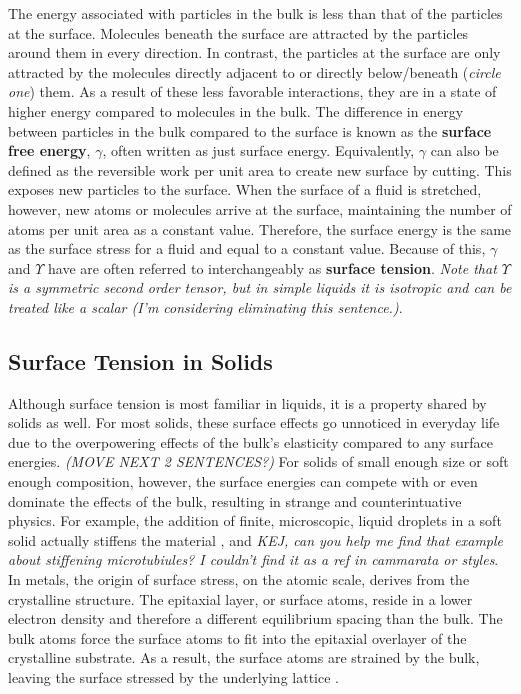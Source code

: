 The energy associated with particles in the bulk is less than that of the particles at the surface. Molecules beneath the surface are attracted by the particles around them in every direction. In contrast, the particles at the surface are only attracted by the molecules directly adjacent to or directly below/beneath (\emph{circle one}) them. As a result of these less favorable interactions, they are in a state of higher energy compared to molecules in the bulk. The difference in energy between particles in the bulk compared to the surface is known as the \textbf{surface free energy}, $\gamma$, often written as just surface energy. Equivalently, $\gamma$ can also be defined as the reversible work per unit area to create new surface by cutting. This exposes new particles to the surface. When the surface of a fluid is stretched, however, new atoms or molecules arrive at the surface, maintaining the number of atoms per unit area as a constant value. Therefore, the surface energy is the same as the surface stress for a fluid and equal to a constant value. Because of this, $\gamma$ and $\Upsilon$ have are often referred to interchangeably as \textbf{surface tension}. \emph{Note that $\Upsilon$ is a symmetric second order tensor, but in simple liquids it is isotropic and can be treated like a scalar (I'm considering eliminating this sentence.)}.
\subsection{Surface Tension in Solids}
Although surface tension is most familiar in liquids, it is a property shared by solids as well. For most solids, these surface effects go unnoticed in everyday life due to the overpowering effects of the bulk's elasticity compared to any surface energies. \emph{(MOVE NEXT 2 SENTENCES?)} For solids of small enough size or soft enough composition, however, the surface energies can compete with or even dominate the effects of the bulk, resulting in strange and counterintuative physics. For example, the addition of finite, microscopic, liquid droplets in a soft solid actually stiffens the material \cite{style2015stiffening}, and \emph{KEJ, can you help me find that example about stiffening microtubiules? I couldn't find it as a ref in cammarata or styles}. In metals, the origin of surface stress, on the atomic scale, derives from the crystalline structure. The epitaxial layer, or surface atoms, reside in a lower electron density and therefore a different equilibrium spacing than the bulk. The bulk atoms force the surface atoms to fit into the epitaxial overlayer of the crystalline substrate. As a result, the surface atoms are strained by the bulk, leaving the surface stressed by the underlying lattice \cite{cammarata1994surface}. 
